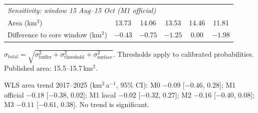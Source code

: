 \documentclass[10pt]{article}
\newcommand{\kmsq}{km$^2$}
\begin{document}
\begin{table}[p]
\begin{threeparttable}
\begin{tabular}{l ccccc}
\midrule
\multicolumn{6}{l}{\textit{Sensitivity: window 15 Aug--15 Oct (M1 official)}} \\
Area (\kmsq)                         & 13.73 & 14.06 & 13.53 & 14.46 & 11.81 \\
Difference to core window (\kmsq)    & $-0.43$ & $-0.75$ & $-1.25$ & 0.00 & $-1.98$ \\
\bottomrule
\end{tabular}
\begin{tablenotes}\footnotesize
\item $\sigma_\mathrm{total} = \sqrt{\sigma_\mathrm{buffer}^2 + \sigma_\mathrm{threshold}^2 + \sigma_\mathrm{surface}^2}$.
Thresholds apply to calibrated probabilities. Published area: 15.5--15.7\,\kmsq.
\item WLS area trend 2017--2025 (\kmsq\,a$^{-1}$, 95\% CI): M0 $-0.09$ [$-0.46$, 0.28];
M1 official $-0.18$ [$-0.38$, 0.02]; M1 local $-0.02$ [$-0.32$, 0.27]; M2 $-0.16$ [$-0.40$, 0.08];
M3 $-0.11$ [$-0.61$, 0.38]. No trend is significant.
\end{tablenotes}
\end{threeparttable}
\end{table}
\end{document}
